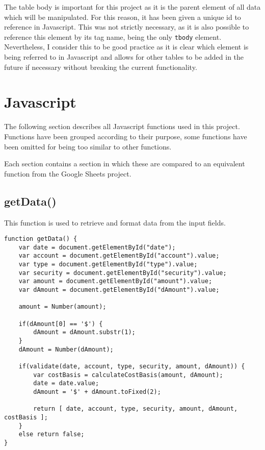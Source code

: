 \documentclass[letterpaper]{article}
\begin{document}
The table body is important for this project as it is the parent element of all data which will be manipulated.
For this reason, it has been given a unique id to reference in Javascript.
This was not strictly necessary, as it is also possible to reference this element by its tag name, being the only \lstinline{tbody} element.
Nevertheless, I consider this to be good practice as it is clear which element is being referred to in Javascript and allows for other tables to be added in the future if necessary without breaking the current functionality.

\newpage

\section{Javascript}\label{JS}

The following section describes all Javascript functions used in this project.
Functions have been grouped according to their purpose, some functions have been omitted for being too similar to other functions.

Each section contains a section in which these are compared to an equivalent function from the Google Sheets project.

\subsection{getData()}

This function is used to retrieve and format data from the input fields.

\begin{lstlisting}[firstnumber=1]
function getData() {
    var date = document.getElementById("date");
    var account = document.getElementById("account").value;
    var type = document.getElementById("type").value;
    var security = document.getElementById("security").value;
    var amount = document.getElementById("amount").value;
    var dAmount = document.getElementById("dAmount").value;

    amount = Number(amount);

    if(dAmount[0] == '$') {
        dAmount = dAmount.substr(1);
    }
    dAmount = Number(dAmount);

    if(validate(date, account, type, security, amount, dAmount)) {
        var costBasis = calculateCostBasis(amount, dAmount);
        date = date.value;
        dAmount = '$' + dAmount.toFixed(2);

        return [ date, account, type, security, amount, dAmount, costBasis ];
    }
    else return false;
}
\end{lstlisting}
\end{document}
